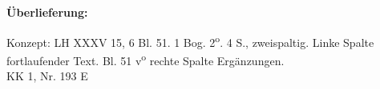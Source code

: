    
        
        \begin{ledgroupsized}[r]{120mm}
        \footnotesize 
        \pstart        
        \noindent\textbf{\"{U}berlieferung:}  
        \pend
        \end{ledgroupsized}
      
       
              \begin{ledgroupsized}[r]{114mm}
              \footnotesize 
              \pstart \parindent -6mm
              Konzept: LH XXXV 15, 6 Bl. 51. 1 Bog. 2\textsuperscript{o}. 4 S., zweispaltig. Linke Spalte fortlaufender Text. Bl. 51 v\textsuperscript{o} rechte Spalte Erg\"{a}nzungen. \\KK 1, Nr. 193 E \pend
              \end{ledgroupsized}
        \vspace*{8mm}
        \pstart 
        \normalsize

